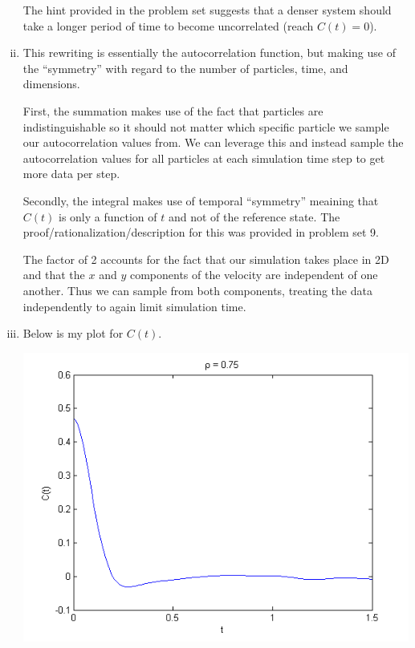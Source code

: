 \documentclass{article}
\begin{document}
\begin{enumerate}[i.]
    The hint provided in the problem set suggests that a denser system should take a longer period of time to become uncorrelated (reach $C(t) = 0$).

  \item This rewriting is essentially the autocorrelation function, but making use of the ``symmetry'' with regard to the number of particles, time, and dimensions. 

First, the summation makes use of the fact that particles are indistinguishable so it should not matter which specific particle we sample our autocorrelation values from. We can leverage this and instead sample the autocorrelation values for all particles at each simulation time step to get more data per step.

Secondly, the integral makes use of temporal ``symmetry'' meaining that $C(t)$ is only a function of $t$ and not of the reference state. The proof/rationalization/description for this was provided in problem set 9.

The factor of 2 accounts for the fact that our simulation takes place in 2D and that the $x$ and $y$ components of the velocity are independent of one another. Thus we can sample from both components, treating the data independently to again limit simulation time.

  \item Below is my plot for $C(t)$.
    \begin{center}
      \includegraphics[scale=0.7]{4v}
    \end{center}


\end{enumerate}
\end{document}
